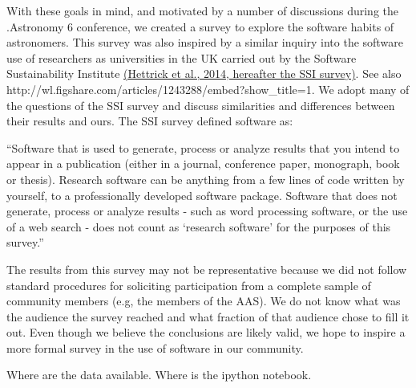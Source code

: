 With these goals in mind, and motivated by a number of discussions during the .Astronomy 6 conference, we created a survey to explore the software habits of astronomers. This survey was also inspired by a similar inquiry into the software use of researchers as universities in the UK carried out by the Software Sustainability Institute \href{(http://www.software.ac.uk/blog/2014-12-04-its-impossible-conduct-research-without-software-say-7-out-10-uk-researchers#comment-14813}{(Hettrick et al., 2014, hereafter the SSI survey)}. See also http://wl.figshare.com/articles/1243288/embed?show_title=1. We adopt many of the questions of the SSI survey and discuss similarities and differences between their results and ours. The SSI survey defined software as:

“Software that is used to generate, process or analyze results that you intend to appear in a publication (either in a journal, conference paper, monograph, book or thesis). Research software can be anything from a few lines of code written by yourself, to a professionally developed software package. Software that does not generate, process or analyze results - such as word processing software, or the use of a web search - does not count as ‘research software’ for the purposes of this survey.”

The results from this survey may not be representative because we did not follow standard procedures for soliciting participation from a complete sample of community members (e.g, the members of the AAS). We do not know what was the audience the survey reached and what fraction of that audience chose to fill it out. Even though we believe the conclusions are likely valid, we hope to inspire a more formal survey in the use of software in our community.

Where are the data available. Where is the ipython notebook.